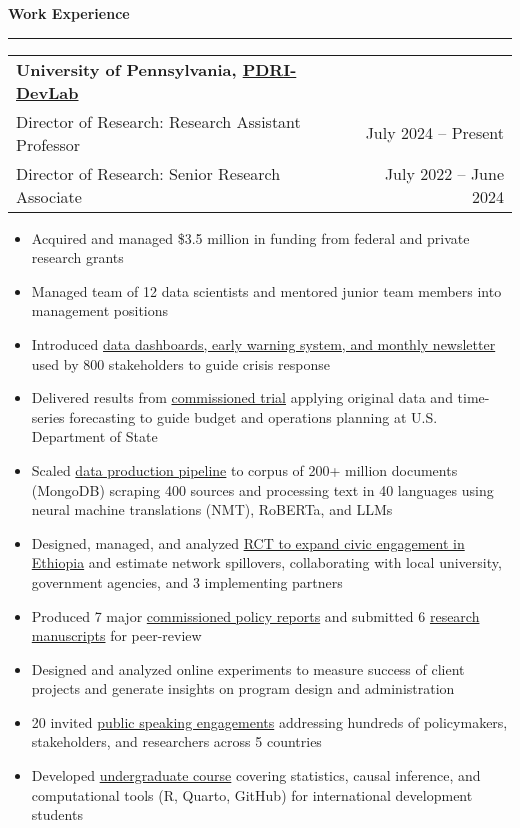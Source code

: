 \documentclass[11pt]{article}
\begin{document}
\textbf{\large Work Experience}\\
\rule[3mm]{\textwidth}{.2pt}
\noindent\begin{tabular*}{\textwidth}{@{}l@{\extracolsep{\fill}}r@{}}
\textbf{University of Pennsylvania, \href{https://web.sas.upenn.edu/dev-lab/}{PDRI-DevLab}}\\
Director of Research: Research Assistant Professor & July 2024 -- Present\\
Director of Research: Senior Research Associate & July 2022 -- June 2024\\
\end{tabular*}
\begin{itemize}[itemsep=0mm, parsep=0pt]
  \item Acquired and managed \$3.5 million in funding from federal and private research grants
  \item Managed team of 12 data scientists and mentored junior team members into management positions 
  \item Introduced \href{https://web.sas.upenn.edu/mlp-devlab/civic-space-data-and-forecasts/}{data dashboards, early warning system, and monthly newsletter} used by 800 stakeholders to guide crisis response
  \item Delivered results from \href{https://bpb-us-w2.wpmucdn.com/web.sas.upenn.edu/dist/4/872/files/2024/11/Forecasting-DOS-Travel-Advisories-with-Machine-Learning-for-Peace-Data-V2-internal.pdf}{commissioned trial} applying original data and time-series forecasting to guide budget and operations planning at U.S. Department of State
  \item Scaled \href{https://bpb-us-w2.wpmucdn.com/web.sas.upenn.edu/dist/4/872/files/2024/08/Presenting_MLP.pdf}{data production pipeline} to corpus of 200+ million documents (MongoDB) scraping 400 sources and processing text in 40 languages using neural machine translations (NMT), RoBERTa, and LLMs
  \item Designed, managed, and analyzed \href{https://jrspringman.github.io/files/ethiopia_ie.pdf}{RCT to expand civic engagement in Ethiopia} and estimate network spillovers, collaborating with local university, government agencies, and 3 implementing partners
  \item Produced 7 major \href{https://jrspringman.github.io/research.html#select-commissioned-policy-reports}{commissioned policy reports} and submitted 6 \href{https://jrspringman.github.io/research.html#under-review}{research manuscripts} for peer-review
   \item Designed and analyzed online experiments to measure success of client projects and generate insights on program design and administration
   \item 20 invited \href{https://jrspringman.github.io/public.html#world-bank-engagefest-webinar}{public speaking engagements} addressing hundreds of policymakers, stakeholders, and researchers across 5 countries
  \item Developed \href{https://jrspringman.github.io/psci3200-globaldev/}{undergraduate course} covering statistics, causal inference, and computational tools (R, Quarto, GitHub) for international development students
\end{itemize}
\end{document}
